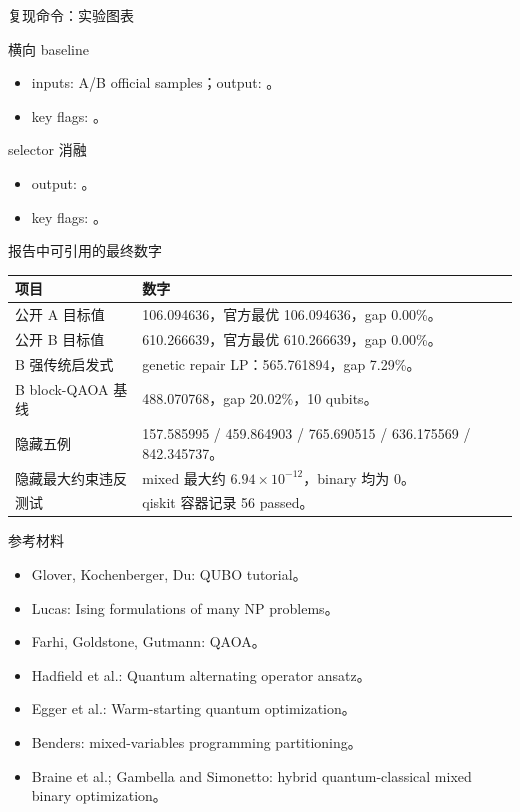\documentclass[aspectratio=169]{beamer}
\begin{document}
\begin{frame}{复现命令：实验图表}
\scriptsize
\begin{block}{横向 baseline}
\begin{itemize}
  \item inputs: A/B official samples；output: 。
  \item key flags: 。
\end{itemize}
\end{block}
\begin{block}{selector 消融}
\begin{itemize}
  \item output: 。
  \item key flags: 。
\end{itemize}
\end{block}
\end{frame}

\begin{frame}{报告中可引用的最终数字}
\scriptsize
\begin{tabularx}{\linewidth}{p{3.4cm}Y}
\toprule
项目 & 数字 \\
\midrule
公开 A 目标值 & 106.094636，官方最优 106.094636，gap 0.00\%。\\
公开 B 目标值 & 610.266639，官方最优 610.266639，gap 0.00\%。\\
B 强传统启发式 & genetic repair LP：565.761894，gap 7.29\%。\\
B block-QAOA 基线 & 488.070768，gap 20.02\%，10 qubits。\\
隐藏五例 & 157.585995 / 459.864903 / 765.690515 / 636.175569 / 842.345737。\\
隐藏最大约束违反 & mixed 最大约 $6.94\times10^{-12}$，binary 均为 0。\\
测试 & qiskit 容器记录 56 passed。\\
\bottomrule
\end{tabularx}
\end{frame}

\begin{frame}{参考材料}
\small
\begin{itemize}
  \item Glover, Kochenberger, Du: QUBO tutorial。
  \item Lucas: Ising formulations of many NP problems。
  \item Farhi, Goldstone, Gutmann: QAOA。
  \item Hadfield et al.: Quantum alternating operator ansatz。
  \item Egger et al.: Warm-starting quantum optimization。
  \item Benders: mixed-variables programming partitioning。
  \item Braine et al.; Gambella and Simonetto: hybrid quantum-classical mixed binary optimization。
\end{itemize}
\end{frame}
\end{document}
